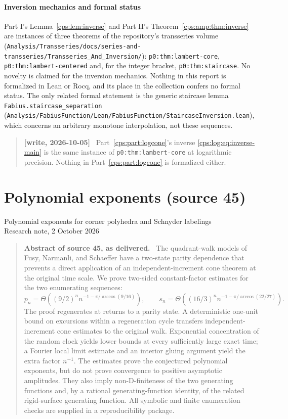 \documentclass[11pt,letterpaper]{article}
\numberwithin{equation}{section}
\theoremstyle{remark}\newtheorem{remark}[theorem]{Remark}
\newcommand{\repo}[1]{\nolinkurl{#1}}
\newenvironment{writenotelog}{\begin{quote}\small\sloppy\textbf{[write, 2026-10-05]}\ }{\end{quote}}
\newenvironment{sourceabstract}[1]{\begin{quote}\small\textbf{Abstract of #1, as delivered.}\ }{\end{quote}}
\begin{document}
\subsection*{Inversion mechanics and formal status}
Part I's Lemma~\ref{cps:lem:inverse} and Part II's Theorem~\ref{cps:amp:thm:inverse} are instances of
three theorems of the repository's transseries volume
(\repo{Analysis/Transseries/docs/series-and-transseries/Transseries_And_Inversion/}):
\texttt{p0:thm:lambert-core}, \texttt{p0:thm:lambert-centered} and, for the integer bracket,
\texttt{p0:thm:staircase}. No novelty is claimed for the inversion mechanics. Nothing in this
report is formalized in Lean or Rocq, and its place in the collection confers no formal status.
The only related formal statement is the generic staircase lemma
\texttt{Fabius.staircase\_separation}
(\repo{Analysis/FabiusFunction/Lean/FabiusFunction/StaircaseInversion.lean}), which concerns an
arbitrary monotone interpolation, not these sequences.
\begin{writenotelog}
Part~\ref{cps:part:logcone}'s inverse \eqref{cps:log:eq:inverse-main} is the same instance of
\texttt{p0:thm:lambert-core} at logarithmic precision. Nothing in Part~\ref{cps:part:logcone} is
formalized either.
\end{writenotelog}
\endgroup
\clearpage
\part{Polynomial exponents (source 45)}\label{cps:part:exponents}
\begin{center}\large Polynomial exponents for corner polyhedra and Schnyder labelings\\[2pt]
\normalsize Research note, 2 October 2026\end{center}
\begin{sourceabstract}{source 45}
The quadrant-walk models of Fusy, Narmanli, and Schaeffer have a two-state parity dependence that prevents a direct application of an independent-increment cone theorem at the original time scale. We prove two-sided constant-factor estimates for the two enumerating sequences:
\[
 p_n=\Theta\!\left((9/2)^n n^{-1-\pi/\arccos(9/16)}\right),\qquad
 s_n=\Theta\!\left((16/3)^n n^{-1-\pi/\arccos(22/27)}\right).
\]
The proof regenerates at returns to a parity state. A deterministic one-unit bound on excursions within a regeneration cycle transfers independent-increment cone estimates to the original walk. Exponential concentration of the random clock yields lower bounds at every sufficiently large exact time; a Fourier local limit estimate and an interior gluing argument yield the extra factor $n^{-1}$. The estimates prove the conjectured polynomial exponents, but do not prove convergence to positive asymptotic amplitudes. They also imply non-D-finiteness of the two generating functions and, by a rational generating-function identity, of the related rigid-surface generating function. All symbolic and finite enumeration checks are supplied in a reproducibility package.
\end{sourceabstract}
\end{document}
